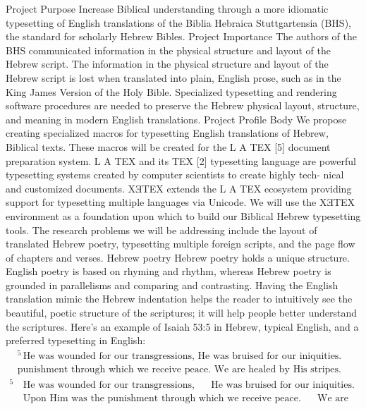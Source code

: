\documentclass{acm_proc_article-sp}
\begin{document}
Project Purpose
Increase Biblical understanding through a more idiomatic typesetting of English translations of the Biblia
Hebraica Stuttgartensia (BHS), the standard for scholarly Hebrew Bibles.
Project Importance
The authors of the BHS communicated information in the physical structure and layout of the Hebrew script.
The information in the physical structure and layout of the Hebrew script is lost when translated into plain,
English prose, such as in the King James Version of the Holy Bible. Specialized typesetting and rendering
software procedures are needed to preserve the Hebrew physical layout, structure, and meaning in modern
English translations.
Project Profile Body
We propose creating specialized macros for typesetting English translations of Hebrew, Biblical texts.
These macros will be created for the L A TEX [5] document preparation system. L A TEX and its TEX [2]
typesetting language are powerful typesetting systems created by computer scientists to create highly tech-
nical and customized documents. XƎTEX extends the L A TEX ecosystem providing support for typesetting
multiple languages via Unicode. We will use the XƎTEX environment as a foundation upon which to build
our Biblical Hebrew typesetting tools. The research problems we will be addressing include the layout of
translated Hebrew poetry, typesetting multiple foreign scripts, and the page flow of chapters and verses.
Hebrew poetry Hebrew poetry holds a unique structure. English poetry is based on rhyming and
rhythm, whereas Hebrew poetry is grounded in parallelisms and comparing and contrasting. Having the
English translation mimic the Hebrew indentation helps the reader to intuitively see the beautiful, poetic
structure of the scriptures; it will help people better understand the scriptures. Here’s an example of Isaiah
53:5 in Hebrew, typical English, and a preferred typesetting in English:
\begin{align}
    &^5\,\text{He was wounded for our transgressions, He was bruised for our iniquities. Upon Him was the} \\
    &\text{punishment through which we receive peace. We are healed by His stripes.}
\end{align}
\begin{align}
    ^5\,&\text{He was wounded for our transgressions, ~~~~He was bruised for our iniquities.} \\
        &\text{Upon Him was the punishment through which we receive peace. ~~~~We are healed by His stripes.}
\end{align}
\end{document}

